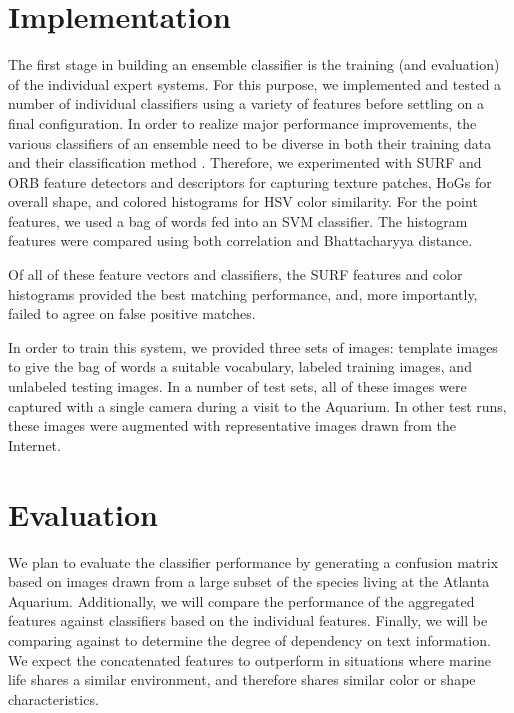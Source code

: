 \documentclass[10pt,twocolumn,letterpaper]{article}
\begin{document}
\section{Implementation}
  The first stage in building an ensemble classifier is the training (and evaluation) of the individual expert systems. For this purpose, we implemented and tested a number of individual classifiers using a variety of features before settling on a final configuration. In order to realize major performance improvements, the various classifiers of an ensemble need to be diverse in both their training data and their classification method \cite{rokach2010ensemble}. Therefore, we experimented with SURF \cite{bay2006surf} and ORB \cite{rublee2011orb} feature detectors and descriptors for capturing texture patches, HoGs \cite{dalal2005histograms} for overall shape, and colored histograms \cite{stricker1995similarity} for HSV color similarity. For the point features, we used a bag of words \cite{csurka2004visual} fed into an SVM classifier. The histogram features were compared using both correlation and Bhattacharyya \cite{bhattacharyya1943distance} distance.
  
  Of all of these feature vectors and classifiers, the SURF features and color histograms provided the best matching performance, and, more importantly, failed to agree on false positive matches. 
  
  In order to train this system, we provided three sets of images: template images to give the bag of words a suitable vocabulary, labeled training images, and unlabeled testing images. In a number of test sets, all of these images were captured with a single camera during a visit to the Aquarium. In other test runs, these images were augmented with representative images drawn from the Internet.

\section{Evaluation}
We plan to evaluate the classifier performance by generating a confusion matrix based on images drawn from a large subset of the species living at the Atlanta Aquarium. 
Additionally, we will compare the performance of the aggregated features against classifiers based on the individual features.
Finally, we will be comparing against \cite{berg2006animals} to determine the degree of dependency on text information.
We expect the concatenated features to outperform in situations where marine life shares a similar environment, and therefore shares similar color or shape characteristics.
\end{document}
